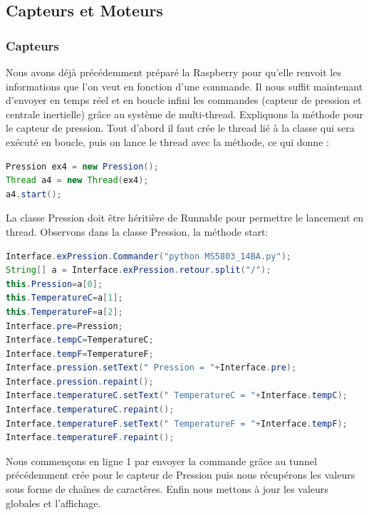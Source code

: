\documentclass[a4paper,11pt]{report}
\begin{document}
		\subsection{Capteurs et Moteurs}
		\subsubsection{Capteurs}
		Nous avons déjà précédemment préparé la Raspberry pour qu'elle renvoit les informations que l'on veut en fonction d'une commande. Il nous suffit maintenant d'envoyer en temps réel et en boucle infini les commandes (capteur de pression et centrale inertielle) grâce au système de multi-thread.
		\newline Expliquons la méthode pour le capteur de pression. Tout d'abord il faut crée le thread lié à la classe qui sera exécuté en boucle, puis on lance le thread avec la méthode, ce qui donne :
		\begin{lstlisting}[language=java]
Pression ex4 = new Pression();
Thread a4 = new Thread(ex4);
a4.start();
		\end{lstlisting}
		La classe Pression doit être héritière de Runnable pour permettre le lancement en thread.
		\newline Observons dans la classe Pression, la méthode start:
		\begin{lstlisting}[language=java]
Interface.exPression.Commander("python MS5803_14BA.py");
String[] a = Interface.exPression.retour.split("/");
this.Pression=a[0];
this.TemperatureC=a[1];
this.TemperatureF=a[2];
Interface.pre=Pression;
Interface.tempC=TemperatureC;
Interface.tempF=TemperatureF;
Interface.pression.setText(" Pression = "+Interface.pre);
Interface.pression.repaint();
Interface.temperatureC.setText(" TemperatureC = "+Interface.tempC);
Interface.temperatureC.repaint();
Interface.temperatureF.setText(" TemperatureF = "+Interface.tempF);
Interface.temperatureF.repaint();
		\end{lstlisting}
		Nous commençons en ligne 1 par envoyer la commande grâce au tunnel précédemment crée pour le capteur de Pression puis nous récupérons les valeurs sous forme de chaînes de caractères.
		\newline Enfin nous mettons à jour les valeurs globales et l’affichage.
		
\end{document}
